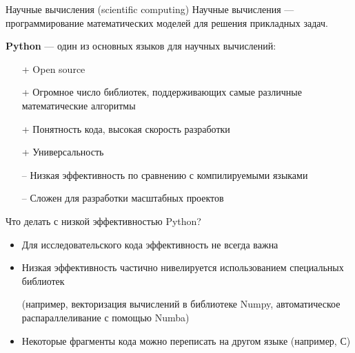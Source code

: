 \documentclass[11pt, fleqn, xcolor=x11names]{beamer}
\begin{document}
\begin{frame}{Научные вычисления (scientific computing)}
	Научные вычисления --- программирование математических моделей для решения прикладных задач.
	
	\hfill
	
	\textbf{Python} --- один из основных языков для научных вычислений:
	\begin{itemize}
		\item[+] Open source
		\item[+] Огромное число библиотек, поддерживающих самые различные математические алгоритмы
		\item[+] Понятность кода, высокая скорость разработки
		\item[+] Универсальность
		\item[--] Низкая эффективность по сравнению с компилируемыми языками
		\item[--] Сложен для разработки масштабных проектов
	\end{itemize}
	
\end{frame}

\begin{frame}{Что делать с низкой эффективностью Python?}

\begin{itemize}
	\item Для исследовательского кода эффективность не всегда важна
	
	\item Низкая эффективность частично нивелируется использованием специальных библиотек
	
	(например, векторизация вычислений в библиотеке Numpy, автоматическое распараллеливание с помощью Numba)
	
	\item Некоторые фрагменты кода можно переписать на другом языке (например, С)
\end{itemize}
\end{frame}
\end{document}
